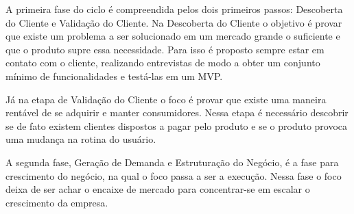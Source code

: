 \par A primeira fase do ciclo é compreendida pelos dois primeiros passos: Descoberta do Cliente e Validação do Cliente. Na Descoberta do Cliente o objetivo é provar que existe um problema a ser solucionado em um mercado grande o suficiente e que o produto supre essa necessidade. Para isso é proposto sempre estar em contato com o cliente, realizando entrevistas de modo a obter um conjunto mínimo de funcionalidades e testá-las em um MVP.
\par Já na etapa de Validação do Cliente o foco é provar que existe uma maneira rentável de se adquirir e manter consumidores. Nessa etapa é necessário descobrir se de fato existem clientes dispostos a pagar pelo produto e se o produto provoca uma mudança na rotina do usuário.
\par A segunda fase, Geração de Demanda e Estruturação do Negócio, é a fase para crescimento do negócio, na qual o foco passa a ser a execução. Nessa fase o foco deixa de ser achar o encaixe de mercado para concentrar-se em escalar o crescimento da empresa.